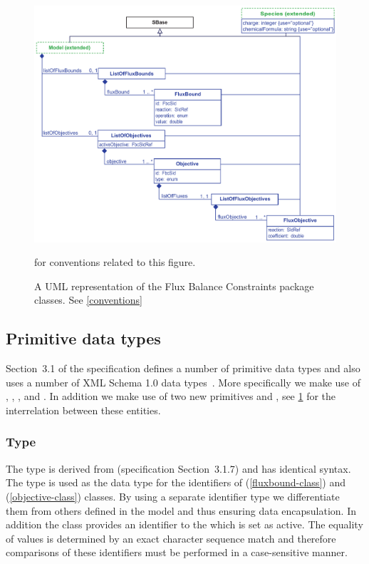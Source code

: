 \begin{figure}[h]
  \centering
  \includegraphics[width=\textwidth]{images/fbc_uml.pdf}\\
  \caption{A UML representation of the Flux Balance Constraints package classes. See \ref{conventions}} for conventions related to this figure. \label{fig:fbc_uml}
\end{figure}

\subsection{Primitive data types}
Section~3.1 of the \sbmlthreecore specification defines a number of
primitive data types and also uses a number of XML Schema 1.0 data
types~\citep{biron:2000}.  More specifically we make use of , , ,  and . In addition we make use of two new primitives  and , see \ref{fig:fbc_uml} for the interrelation between these entities.

\subsubsection{Type }
\label{primtype-fbcsid}

The type  is derived from  (\sbmlthreecore specification Section~3.1.7) and has identical syntax. The  type is used as the data type for the identifiers of \FluxBound (\ref{fluxbound-class}) and \Objective (\ref{objective-class}) classes. By using a separate identifier type we differentiate them from others defined in the \SBML model and thus ensuring data encapsulation. In addition the \Objective class  provides an identifier to the \Objective which is set as active. The equality of  values is determined by an exact character sequence match and therefore comparisons of these identifiers must be performed in a case-sensitive manner.

